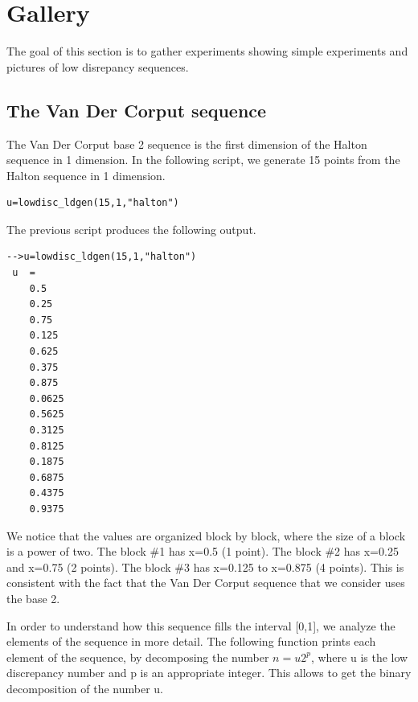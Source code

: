 %

    \chapter{Gallery}

The goal of this section is to gather experiments showing 
simple experiments and pictures of low disrepancy sequences.

\section{The Van Der Corput sequence}

The Van Der Corput base 2 sequence is the first dimension of 
the Halton sequence in 1 dimension. 
In the following script, we generate 15 points from the 
Halton sequence in 1 dimension.

\lstset{language=scilabscript}
\begin{lstlisting}
u=lowdisc_ldgen(15,1,"halton")
\end{lstlisting}

      The previous script produces the following output.

\lstset{language=scilabscript}
\begin{lstlisting}
-->u=lowdisc_ldgen(15,1,"halton")
 u  =
    0.5     
    0.25    
    0.75    
    0.125   
    0.625   
    0.375   
    0.875   
    0.0625  
    0.5625  
    0.3125  
    0.8125  
    0.1875  
    0.6875  
    0.4375  
    0.9375  
\end{lstlisting}

    
We notice that the values are organized block by block, 
where the size of a block is a power of two. 
The block \#1 has x=0.5 (1 point). 
The block \#2 has x=0.25 and x=0.75 (2 points). 
The block \#3 has x=0.125 to x=0.875 (4 points). 
This is consistent with the fact that the Van Der Corput 
sequence that we consider uses the base 2.

In order to understand how this sequence fills the interval [0,1], 
we analyze the elements of the sequence in more detail. 
The following function prints each element of the sequence, 
by decomposing the number $n=u 2^p$, where u is the low discrepancy 
number and p is an appropriate integer. 
This allows to get the binary decomposition of the number u.
    

